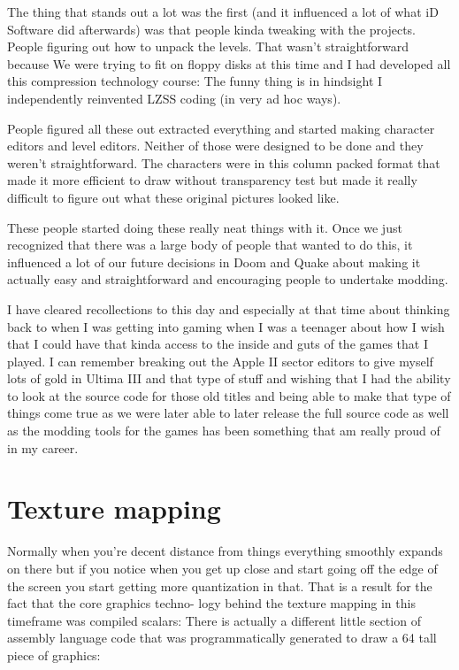 \documentclass[book.tex]{subfiles}
\begin{document}
The thing that stands out a lot was the first (and it influenced a lot
of what iD Software did afterwards) was that people kinda tweaking with
the projects. People figuring out how to unpack the levels. That 
wasn't straightforward because We were trying to fit on floppy disks 
at this time and I had developed all this compression technology course:
The funny thing is in hindsight I independently reinvented LZSS coding 
(in very ad hoc ways). \\
\par
People figured all these out extracted everything and started making 
character editors and  level editors. Neither of those were designed 
to be done and they weren't straightforward. The characters were in 
this column packed format that made it more efficient to draw without 
transparency test but made it really difficult to figure out what 
these original pictures looked like. \\
\par
These people started doing these really neat things with it. Once we 
just recognized that there was a large body of people that wanted to 
do this, it influenced a lot of our future decisions in Doom and Quake 
about making it actually easy and straightforward and encouraging 
people to undertake modding.\\
\par
I have cleared recollections to this day and especially at that time 
about thinking back to when I was getting into gaming when I was a 
teenager about how I wish that I could have that kinda access to the 
inside and guts of the games that I played. I can remember breaking 
out the Apple II sector editors to give myself lots of gold in 
Ultima III and that type of stuff and wishing that I had the ability 
to look at the source code for those old titles and being able to 
make that type of things come true as we were later able to later 
release  the full source code as well as the modding tools for the 
games has been something that am really proud of in my career.\\




\section{Texture mapping}


Normally when you're decent distance from things everything smoothly 
expands on there but if you notice when you get up close and start 
going off the edge of the screen you start getting more quantization 
in that. That is a result for the fact that the core graphics techno-
logy behind the texture mapping in this timeframe was compiled 
scalars: There is actually a different little section of assembly 
language code that was programmatically generated to draw a 64 tall 
piece of graphics:\\
\end{document}

